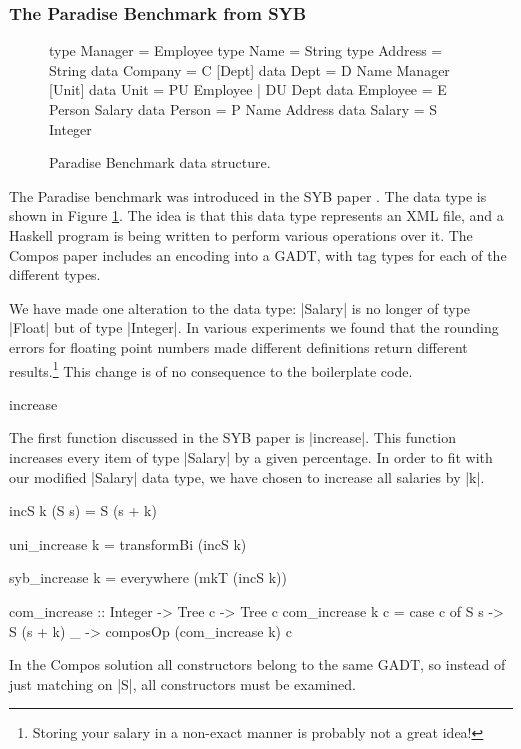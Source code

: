 \subsubsection{The Paradise Benchmark from SYB}

\begin{figure}
\begin{code}
type  Manager   = Employee
type  Name      = String
type  Address   = String
data  Company   = C [Dept]
data  Dept      = D Name Manager [Unit]
data  Unit      = PU Employee | DU Dept
data  Employee  = E Person Salary
data  Person    = P Name Address
data  Salary    = S Integer
\end{code}
\caption{Paradise Benchmark data structure.}
\label{figU:paradise}
\end{figure}

The Paradise benchmark was introduced in the SYB paper \citep{lammel:syb}. The data type is shown in Figure \ref{figU:paradise}. The idea is that this data type represents an XML file, and a Haskell program is being written to perform various operations over it. The Compos paper includes an encoding into a GADT, with tag types for each of the different types.

We have made one alteration to the data type: |Salary| is no longer of type |Float| but of type |Integer|. In various experiments we found that the rounding errors for floating point numbers made different definitions return different results.\footnote{Storing your salary in a non-exact manner is probably not a great idea!} This change is of no consequence to the boilerplate code.

\begin{examplename}{increase}

The first function discussed in the SYB paper is |increase|. This function increases every item of type |Salary| by a given percentage. In order to fit with our modified |Salary| data type, we have chosen to increase all salaries by |k|.

\ignore\begin{code}
incS k (S s) = S (s + k)

uni_increase k = transformBi (incS k)

syb_increase k = everywhere (mkT (incS k))

com_increase :: Integer -> Tree c -> Tree c
com_increase k c = case c of
    S s -> S (s + k)
    _ -> composOp (com_increase k) c
\end{code}

In the Compos solution all constructors belong to the same GADT, so instead of just matching on |S|, all constructors must be examined.
\end{examplename}

